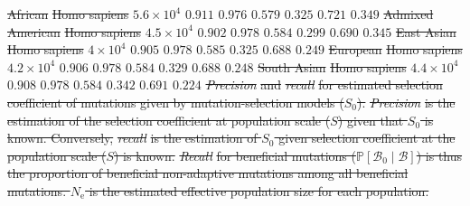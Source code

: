 \documentclass{article} %
\newcommand{\Ne}{N_{\text{e}}}
\newcommand{\proba}{\mathbb{P}}
\newcommand{\Sphy}{S_{0}}
\newcommand{\SphyBen}{\mathcal{B}_0}
\newcommand{\given}{\mid}
\newcommand{\Spop}{S}
\newcommand{\SpopBen}{\mathcal{B}}
\providecommand{\DIFdeltex}[1]{{\protect\color{red}\sout{#1}}}                      %
\providecommand{\DIFdelFL}[1]{\DIFdel{#1}} %
\providecommand{\DIFdel}[1]{\texorpdfstring{\DIFdeltex{#1}}{}} %
\begin{document}
\DIFdelFL{African }%
\DIFdelFL{Homo sapiens }%
\DIFdelFL{$5.6\times 10^{4}$ }%
\DIFdelFL{$ 0.911$ }%
\DIFdelFL{$ 0.976$ }%
\DIFdelFL{$ 0.579$ }%
\DIFdelFL{$ 0.325$ }%
\DIFdelFL{$ 0.721$ }%
\DIFdelFL{$ 0.349$ }%
\DIFdelFL{Admixed American }%
\DIFdelFL{Homo sapiens }%
\DIFdelFL{$4.5\times 10^{4}$ }%
\DIFdelFL{$ 0.902$ }%
\DIFdelFL{$ 0.978$ }%
\DIFdelFL{$ 0.584$ }%
\DIFdelFL{$ 0.299$ }%
\DIFdelFL{$ 0.690$ }%
\DIFdelFL{$ 0.345$ }%
\DIFdelFL{East Asian }%
\DIFdelFL{Homo sapiens }%
\DIFdelFL{$ 4\times 10^{4}$ }%
\DIFdelFL{$ 0.905$ }%
\DIFdelFL{$ 0.978$ }%
\DIFdelFL{$ 0.585$ }%
\DIFdelFL{$ 0.325$ }%
\DIFdelFL{$ 0.688$ }%
\DIFdelFL{$ 0.249$ }%
\DIFdelFL{European }%
\DIFdelFL{Homo sapiens }%
\DIFdelFL{$4.2\times 10^{4}$ }%
\DIFdelFL{$ 0.906$ }%
\DIFdelFL{$ 0.978$ }%
\DIFdelFL{$ 0.584$ }%
\DIFdelFL{$ 0.329$ }%
\DIFdelFL{$ 0.688$ }%
\DIFdelFL{$ 0.248$ }%
\DIFdelFL{South Asian }%
\DIFdelFL{Homo sapiens }%
\DIFdelFL{$4.4\times 10^{4}$ }%
\DIFdelFL{$ 0.908$ }%
\DIFdelFL{$ 0.978$ }%
\DIFdelFL{$ 0.584$ }%
\DIFdelFL{$ 0.342$ }%
\DIFdelFL{$ 0.691$ }%
\DIFdelFL{$ 0.224$ }%
{%
\textit{\DIFdelFL{Precision}} %
\DIFdelFL{and }\textit{\DIFdelFL{recall}} %
\DIFdelFL{for estimated selection coefficient of mutations given by mutation-selection models ($\Sphy$).
              }\textit{\DIFdelFL{Precision}} %
\DIFdelFL{is the estimation of the selection coefficient at population scale ($\Spop$) given that $\Sphy$ is known.
              Conversely, }\textit{\DIFdelFL{recall}} %
\DIFdelFL{is the estimation of $\Sphy$ given selection coefficient at the population scale ($\Spop$) is known.
              }\textit{\DIFdelFL{Recall}} %
\DIFdelFL{for beneficial mutations ($\proba [\SphyBen \given \SpopBen]$) is thus the proportion of beneficial non-adaptive mutations among all beneficial mutations.
              $\Ne$ is the estimated effective population size for each population.
       }}
\end{document}
